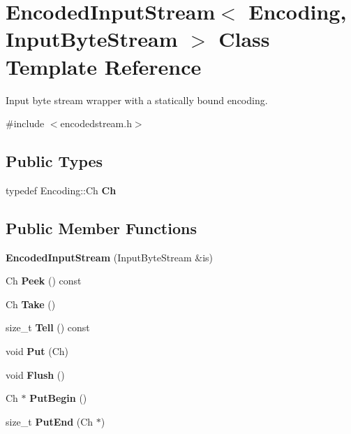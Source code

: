 \hypertarget{a02124}{}\section{Encoded\+Input\+Stream$<$ Encoding, Input\+Byte\+Stream $>$ Class Template Reference}
\label{a02124}


Input byte stream wrapper with a statically bound encoding.  




{\ttfamily \#include $<$encodedstream.\+h$>$}

\subsection*{Public Types}
\begin{DoxyCompactItemize}
\item 
\mbox{\label{a02124_acc387a1364390da244bbb1ab07bdceca}} 
typedef Encoding\+::\+Ch {\bfseries Ch}
\end{DoxyCompactItemize}
\subsection*{Public Member Functions}
\begin{DoxyCompactItemize}
\item 
\mbox{\label{a02124_a17f8e629500f6ae71cb72d1d63bf41fd}} 
{\bfseries Encoded\+Input\+Stream} (Input\+Byte\+Stream \&is)
\item 
\mbox{\label{a02124_a046ab121d8dd303b9dc14d4b34940fad}} 
Ch {\bfseries Peek} () const
\item 
\mbox{\label{a02124_ab42cd57581bf62e42af471583e5b8377}} 
Ch {\bfseries Take} ()
\item 
\mbox{\label{a02124_afbe4ac0fc57fa992ba3aa5da8dc66527}} 
size\+\_\+t {\bfseries Tell} () const
\item 
\mbox{\label{a02124_afea36b666a44bd4adeabfcab7b68a322}} 
void {\bfseries Put} (Ch)
\item 
\mbox{\label{a02124_aa4415bf4b97dd01e8c3de0ad7a161724}} 
void {\bfseries Flush} ()
\item 
\mbox{\label{a02124_ad97f7a549a8622c61b7fb2c63fedd69b}} 
Ch $\ast$ {\bfseries Put\+Begin} ()
\item 
\mbox{\label{a02124_a83fe5ed281413d6005d1b324730e8bed}} 
size\+\_\+t {\bfseries Put\+End} (Ch $\ast$)
\end{DoxyCompactItemize}


